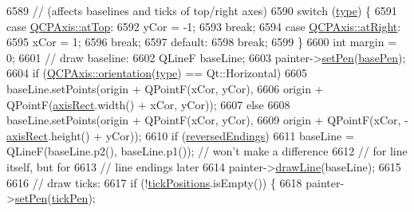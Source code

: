 \begin{DoxyCode}
6589                              \textcolor{comment}{// (affects baselines and ticks of top/right axes)}
6590   \textcolor{keywordflow}{switch} (\hyperlink{class_q_c_p_axis_painter_private_ae04594e97417336933d807c86d353098}{type}) \{
6591   \textcolor{keywordflow}{case} \hyperlink{class_q_c_p_axis_ae2bcc1728b382f10f064612b368bc18aac0ece2b680d3f545e701f75af1655977}{QCPAxis::atTop}:
6592     yCor = -1;
6593     \textcolor{keywordflow}{break};
6594   \textcolor{keywordflow}{case} \hyperlink{class_q_c_p_axis_ae2bcc1728b382f10f064612b368bc18aadf5509f7d29199ef2f263b1dd224b345}{QCPAxis::atRight}:
6595     xCor = 1;
6596     \textcolor{keywordflow}{break};
6597   \textcolor{keywordflow}{default}:
6598     \textcolor{keywordflow}{break};
6599   \}
6600   \textcolor{keywordtype}{int} margin = 0;
6601   \textcolor{comment}{// draw baseline:}
6602   QLineF baseLine;
6603   painter->\hyperlink{class_q_c_p_painter_af9c7a4cd1791403901f8c5b82a150195}{setPen}(\hyperlink{class_q_c_p_axis_painter_private_ab4affb27ae3485fecb7466622cabcbb2}{basePen});
6604   \textcolor{keywordflow}{if} (\hyperlink{class_q_c_p_axis_a57483f2f60145ddc9e63f3af53959265}{QCPAxis::orientation}(\hyperlink{class_q_c_p_axis_painter_private_ae04594e97417336933d807c86d353098}{type}) == Qt::Horizontal)
6605     baseLine.setPoints(origin + QPointF(xCor, yCor),
6606                        origin + QPointF(\hyperlink{class_q_c_p_axis_painter_private_afcd55b0e1ecd689fffd2b1fc75dc7732}{axisRect}.width() + xCor, yCor));
6607   \textcolor{keywordflow}{else}
6608     baseLine.setPoints(origin + QPointF(xCor, yCor),
6609                        origin + QPointF(xCor, -\hyperlink{class_q_c_p_axis_painter_private_afcd55b0e1ecd689fffd2b1fc75dc7732}{axisRect}.height() + yCor));
6610   \textcolor{keywordflow}{if} (\hyperlink{class_q_c_p_axis_painter_private_a06d0ef3f4f1b567feb84196fc3b140da}{reversedEndings})
6611     baseLine = QLineF(baseLine.p2(), baseLine.p1()); \textcolor{comment}{// won't make a difference}
6612                                                      \textcolor{comment}{// for line itself, but for}
6613                                                      \textcolor{comment}{// line endings later}
6614   painter->\hyperlink{class_q_c_p_painter_a0b4b1b9bd495e182c731774dc800e6e0}{drawLine}(baseLine);
6615 
6616   \textcolor{comment}{// draw ticks:}
6617   \textcolor{keywordflow}{if} (!\hyperlink{class_q_c_p_axis_painter_private_ae55e3dc2cf2af8d8a6e7235ccab54786}{tickPositions}.isEmpty()) \{
6618     painter->\hyperlink{class_q_c_p_painter_af9c7a4cd1791403901f8c5b82a150195}{setPen}(\hyperlink{class_q_c_p_axis_painter_private_a389dde97f02fdee23965e4736e7d8c62}{tickPen});

\end{DoxyCode}
